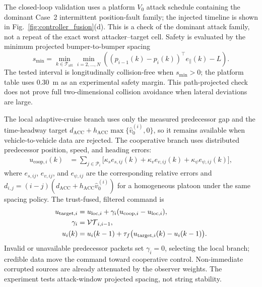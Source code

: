 \documentclass[letterpaper,journal]{IEEEtran}
\def\VT{\mathcal{VT}} %
\begin{document}
The closed-loop validation uses a platform \(V_0\) attack schedule containing the dominant Case~2 intermittent position-fault family; the injected timeline is shown in Fig.~\ref{fig:controller_fusion}(d). This is a check of the dominant attack family, not a repeat of the exact worst attacker--target cell. Safety is evaluated by the minimum projected bumper-to-bumper spacing
\begin{equation}
    s_{\min}=\min_{k\in\mathcal{T}_{\mathrm{att}}}\min_{i=2,\ldots,N}
    \left((p_{i-1}(k)-p_i(k))^\top e_{\parallel}(k)-L\right).
\end{equation}
The tested interval is longitudinally collision-free when $s_{\min}>0$; the platform table uses $0.30$~m as an experimental safety margin. This path-projected check does not prove full two-dimensional collision avoidance when lateral deviations are large.

The local adaptive-cruise branch uses only the measured predecessor gap and the time-headway target $d_{\mathrm{ACC}}+h_{\mathrm{ACC}}\max\{\hat v_0^{(i)},0\}$, so it remains available when vehicle-to-vehicle data are rejected. The cooperative branch uses distributed predecessor position, speed, and heading errors:
\begin{align}
u_{\mathrm{coop},i}(k)
&= \sum_{j\in\mathcal{P}_i} \big[
    \kappa_s e_{s,ij}(k)
    + \kappa_v e_{v,ij}(k)
    + \kappa_{\psi} e_{\psi,ij}(k)\big],
\end{align}
where $e_{s,ij}$, $e_{v,ij}$, and $e_{\psi,ij}$ are the corresponding relative errors and $d_{i,j}=(i-j)(d_{\mathrm{ACC}}+h_{\mathrm{ACC}}\hat v_0^{(i)})$ for a homogeneous platoon under the same spacing policy. The trust-fused, filtered command is
\begin{align}
u_{\mathrm{target},i}
&=u_{\mathrm{loc},i}+\gamma_i(u_{\mathrm{coop},i}-u_{\mathrm{loc},i}),\notag\\
\gamma_i&=\VT_{i,i-1},\notag\\
u_i(k)&=u_i(k-1)+\tau_f\big(u_{\mathrm{target},i}(k)-u_i(k-1)\big).
\end{align}
Invalid or unavailable predecessor packets set $\gamma_i=0$, selecting the local branch; credible data move the command toward cooperative control. Non-immediate corrupted sources are already attenuated by the observer weights. The experiment tests attack-window projected spacing, not string stability.
\end{document}
